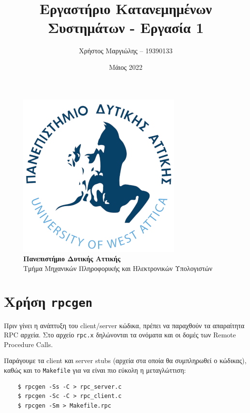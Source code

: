 \documentclass{article}
\title{Εργαστήριο Κατανεμημένων Συστημάτων - Εργασία 1}
\author{Χρήστος Μαργιώλης -- 19390133}
\date{Μάιος 2022}
\begin{document}
\begin{titlepage}
        \maketitle
        \begin{figure}[t!]
        \begin{center}
        \includegraphics[scale=0.3]{./res/uniwalogo.png} \\
        \Large
        \textbf{Πανεπιστήμιο Δυτικής Αττικής} \\
        \large
        Τμήμα Μηχανικών Πληροφορικής και Ηλεκτρονικών Υπολογιστών
        \end{center}
        \end{figure}
\end{titlepage}

\renewcommand{\contentsname}{Περιεχόμενα}
\tableofcontents

\section{Χρήση \lstinline{rpcgen}}

Πριν γίνει η ανάπτυξη του client/server κώδικα, πρέπει να παραχθούν τα
απαραίτητα RPC αρχεία. Στο αρχείο \lstinline{rpc.x} δηλώνονται τα ονόματα
και οι δομές των Remote Procedure Calls.

Παράγουμε τα client και server stubs (αρχεία στα οποία θα συμπληρωθεί ο
κώδικας), καθώς και το \lstinline{Makefile} για να είναι πιο εύκολη η
μεταγλώττιση:

\begin{lstlisting}
	$ rpcgen -Ss -C > rpc_server.c
	$ rpcgen -Sc -C > rpc_client.c
	$ rpcgen -Sm > Makefile.rpc
\end{lstlisting}
\end{document}
